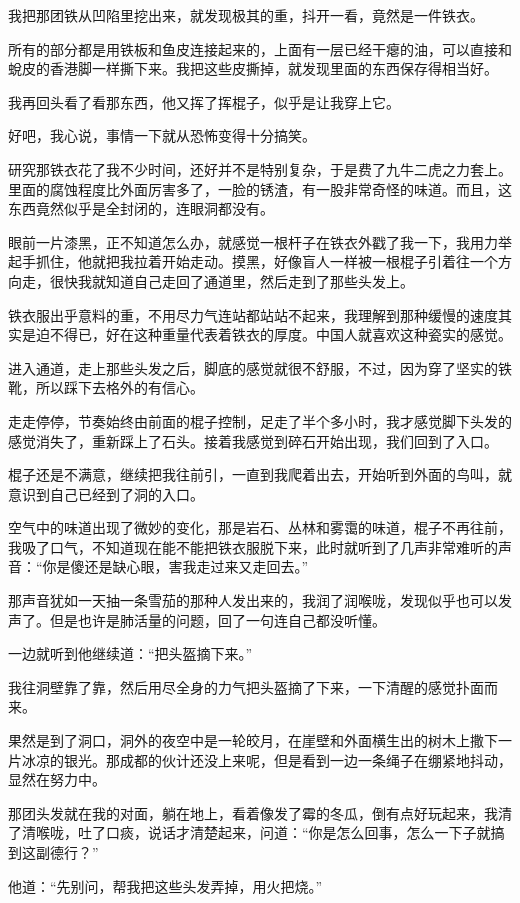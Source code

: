 我把那团铁从凹陷里挖出来，就发现极其的重，抖开一看，竟然是一件铁衣。

所有的部分都是用铁板和鱼皮连接起来的，上面有一层已经干瘪的油，可以直接和蛻皮的香港脚一样撕下来。我把这些皮撕掉，就发现里面的东西保存得相当好。

我再回头看了看那东西，他又挥了挥棍子，似乎是让我穿上它。

好吧，我心说，事情一下就从恐怖变得十分搞笑。

研究那铁衣花了我不少时间，还好并不是特别复杂，于是费了九牛二虎之力套上。里面的腐蚀程度比外面厉害多了，一脸的锈渣，有一股非常奇怪的味道。而且，这东西竟然似乎是全封闭的，连眼洞都没有。

眼前一片漆黑，正不知道怎么办，就感觉一根杆子在铁衣外戳了我一下，我用力举起手抓住，他就把我拉着开始走动。摸黑，好像盲人一样被一根棍子引着往一个方向走，很快我就知道自己走回了通道里，然后走到了那些头发上。

铁衣服出乎意料的重，不用尽力气连站都站站不起来，我理解到那种缓慢的速度其实是迫不得已，好在这种重量代表着铁衣的厚度。中国人就喜欢这种瓷实的感觉。

进入通道，走上那些头发之后，脚底的感觉就很不舒服，不过，因为穿了坚实的铁靴，所以踩下去格外的有信心。

走走停停，节奏始终由前面的棍子控制，足走了半个多小时，我才感觉脚下头发的感觉消失了，重新踩上了石头。接着我感觉到碎石开始出现，我们回到了入口。

棍子还是不满意，继续把我往前引，一直到我爬着出去，开始听到外面的鸟叫，就意识到自己已经到了洞的入口。

空气中的味道出现了微妙的变化，那是岩石、丛林和雾霭的味道，棍子不再往前，我吸了口气，不知道现在能不能把铁衣服脱下来，此时就听到了几声非常难听的声音：“你是傻还是缺心眼，害我走过来又走回去。”

那声音犹如一天抽一条雪茄的那种人发出来的，我润了润喉咙，发现似乎也可以发声了。但是也许是肺活量的问题，回了一句连自己都没听懂。

一边就听到他继续道：“把头盔摘下来。”

我往洞壁靠了靠，然后用尽全身的力气把头盔摘了下来，一下清醒的感觉扑面而来。

果然是到了洞口，洞外的夜空中是一轮皎月，在崖壁和外面横生出的树木上撒下一片冰凉的银光。那成都的伙计还没上来呢，但是看到一边一条绳子在绷紧地抖动，显然在努力中。

那团头发就在我的对面，躺在地上，看着像发了霉的冬瓜，倒有点好玩起来，我清了清喉咙，吐了口痰，说话才清楚起来，问道：“你是怎么回事，怎么一下子就搞到这副德行？”

他道：“先别问，帮我把这些头发弄掉，用火把烧。”

